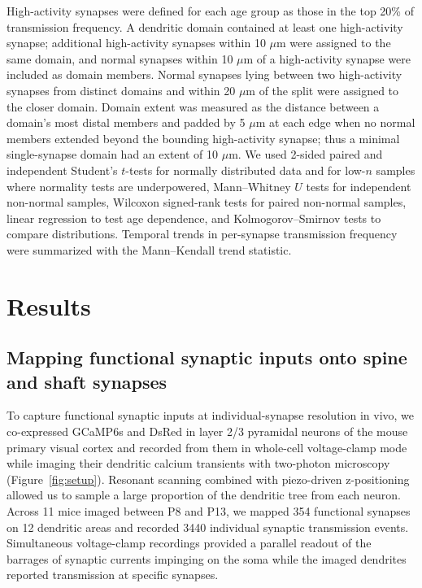 \documentclass[11pt]{article}
\begin{document}
High-activity synapses were defined for each age group as those in the top 20\% of transmission frequency. A dendritic domain contained at least one high-activity synapse; additional high-activity synapses within 10 $\mu$m were assigned to the same domain, and normal synapses within 10 $\mu$m of a high-activity synapse were included as domain members. Normal synapses lying between two high-activity synapses from distinct domains and within 20 $\mu$m of the split were assigned to the closer domain. Domain extent was measured as the distance between a domain's most distal members and padded by 5 $\mu$m at each edge when no normal members extended beyond the bounding high-activity synapse; thus a minimal single-synapse domain had an extent of 10 $\mu$m. We used 2-sided paired and independent Student's $t$-tests for normally distributed data and for low-$n$ samples where normality tests are underpowered, Mann--Whitney $U$ tests for independent non-normal samples, Wilcoxon signed-rank tests for paired non-normal samples, linear regression to test age dependence, and Kolmogorov--Smirnov tests to compare distributions. Temporal trends in per-synapse transmission frequency were summarized with the Mann--Kendall trend statistic.

\section{Results}

\subsection{Mapping functional synaptic inputs onto spine and shaft synapses}

To capture functional synaptic inputs at individual-synapse resolution in vivo, we co-expressed GCaMP6s and DsRed in layer 2/3 pyramidal neurons of the mouse primary visual cortex and recorded from them in whole-cell voltage-clamp mode while imaging their dendritic calcium transients with two-photon microscopy (Figure~\ref{fig:setup}). Resonant scanning combined with piezo-driven z-positioning allowed us to sample a large proportion of the dendritic tree from each neuron. Across 11 mice imaged between P8 and P13, we mapped 354 functional synapses on 12 dendritic areas and recorded 3440 individual synaptic transmission events. Simultaneous voltage-clamp recordings provided a parallel readout of the barrages of synaptic currents impinging on the soma while the imaged dendrites reported transmission at specific synapses.
\end{document}
